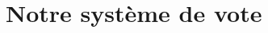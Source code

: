 \documentclass[conference]{IEEEtran}
\begin{document}




\section{Notre syst\`eme de vote}
\label{sec:laprimaire}
\end{document}
